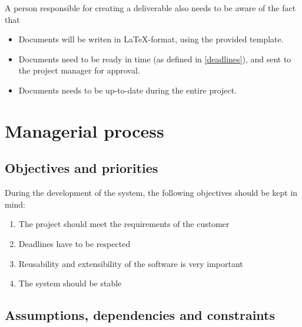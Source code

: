 \documentclass[a4paper, 12pt]{report}
\begin{document}
			A person responsible for creating a deliverable also needs to be aware
			of the fact that
			
			\begin{itemize}
				
				\item Documents will be writen in \LaTeX-format, using the provided template.
				
				\item Documents need to be ready in time (as defined in \ref{deadlines}), and
				sent to the project manager for approval. 
				
				\item Documents needs to be up-to-date during the entire project. 
				
			\end{itemize}
			
	\chapter{Managerial process}
		
		\section{Objectives and priorities}
			
			During the development of the system, the following objectives should be kept
			in mind:
			
			\begin{enumerate}
				
				\item The project should meet the requirements of the customer
				\item Deadlines have to be respected
				\item Reusability and extensibility of the software is very important
				\item The system should be stable
				
			\end{enumerate}	
			
		\section{Assumptions, dependencies and constraints}
			
\end{document}
